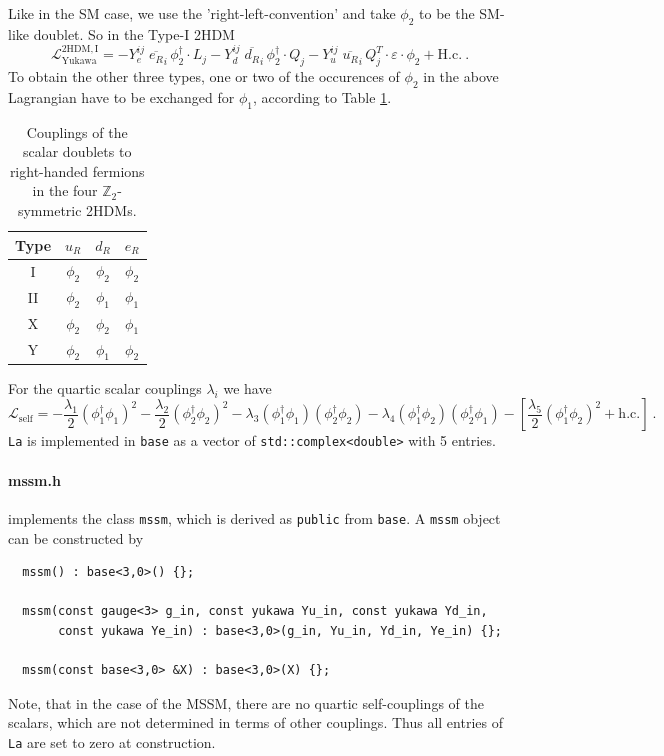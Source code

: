 \documentclass[11pt,a4paper]{article}
\begin{document}
Like in the SM case, we use the 'right-left-convention' and take $\phi_2$ to be the SM-like doublet. So in the Type-I 2HDM
\begin{equation} \label{eq:thdm_yuk}
    \mathcal{L}_{\mathrm{Yukawa}}^{\mathrm{2HDM,I}} = - Y_e^{ij}\; \overline{e_{R}}_{i} \, \phi_2^\dagger \cdot L_j
  - Y_d^{ij}\; \overline{d_{R}}_{i} \, \phi_2^\dagger \cdot Q_j
  - Y_u^{ij}\; \overline{u_{R}}_{i} \, Q_j^T \cdot \varepsilon \cdot \phi_2 + \mathrm{H.c.}~.
\end{equation}
To obtain the other three types, one or two of the occurences of $\phi_2$ in the above Lagrangian have to be exchanged for $\phi_1$, according to Table \ref{tbl::2hdm}.

\begin{table}
  \centering
  \begin{tabular}{cccc} \toprule
    Type & $u_R$ & $d_R$ & $e_R$ \\\midrule
    I & $\phi_2$ & $\phi_2$ & $\phi_2$ \\
    II & $\phi_2$ & $\phi_1$ & $\phi_1$ \\
    X & $\phi_2$ & $\phi_2$ & $\phi_1$ \\
    Y & $\phi_2$ & $\phi_1$ & $\phi_2$ \\
    \bottomrule
  \end{tabular}
  \caption{\label{tbl::2hdm} Couplings of the scalar doublets to right-handed fermions in the four $\mathbb{Z}_2$-symmetric 2HDMs.}
\end{table}

For the quartic scalar couplings $\lambda_i$ we have
\begin{equation} \label{eq:thdm_la}
  \mathcal{L}_{\mathrm{self}} = -\frac{\lambda_1}{2} (\phi_1^\dagger\phi_1)^2 -\frac{\lambda_2}{2} (\phi_2^\dagger\phi_2)^2 - \lambda_3(\phi_1^\dagger\phi_1)(\phi_2^\dagger\phi_2) - \lambda_4(\phi_1^\dagger\phi_2)(\phi_2^\dagger\phi_1)
                                -\left[\frac{\lambda_5}{2} (\phi_1^\dagger\phi_2)^2 + \mathrm{h.c.}\right]~.
\end{equation}
\texttt{La} is implemented in \texttt{base} as a vector of \texttt{std::complex<double>} with 5 entries.

\paragraph{mssm.h}
implements the class \texttt{mssm}, which is derived as \texttt{public} from \texttt{base}. A \texttt{mssm} object can be constructed by
\begin{lstlisting}
  mssm() : base<3,0>() {};
 
  mssm(const gauge<3> g_in, const yukawa Yu_in, const yukawa Yd_in,
       const yukawa Ye_in) : base<3,0>(g_in, Yu_in, Yd_in, Ye_in) {};
 
  mssm(const base<3,0> &X) : base<3,0>(X) {};
\end{lstlisting}
Note, that in the case of the MSSM, there are no quartic self-couplings of the scalars, which are not determined in terms of other couplings.
Thus all entries of \texttt{La} are set to zero at construction.
\end{document}

